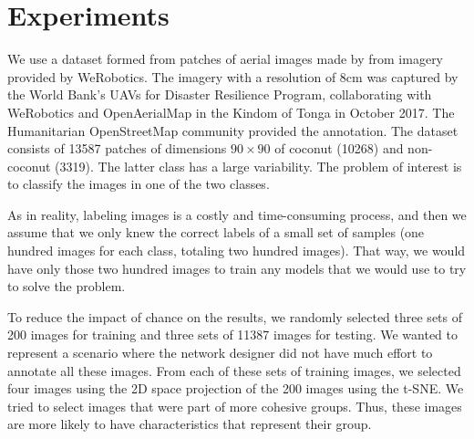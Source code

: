 \documentclass[a4paper,conference]{IEEEtran}
\begin{document}
\section{Experiments}
We use a dataset formed from patches of aerial images made by \cite{8899005} from imagery provided by WeRobotics. The imagery with a resolution of 8cm was captured by the World Bank's UAVs for Disaster Resilience Program, collaborating with WeRobotics and OpenAerialMap in the Kindom of Tonga in October 2017. The Humanitarian OpenStreetMap community provided the annotation. The dataset consists of 13587 patches of dimensions $90 \times 90$ of coconut (10268) and non-coconut (3319). The latter class has a large variability. The problem of interest is to classify the images in one of the two classes.

As in reality, labeling images is a costly and time-consuming process, and then we assume that we only knew the correct labels of a small set of samples (one hundred images for each class, totaling two hundred images). That way, we would have only those two hundred images to train any models that we would use to try to solve the problem.

To reduce the impact of chance on the results, we randomly selected three sets of 200 images for training and three sets of 11387 images for testing. We wanted to represent a scenario where the network designer did not have much effort to annotate all these images. From each of these sets of training images, we selected four images using the 2D space projection of the 200 images using the t-SNE. We tried to select images that were part of more cohesive groups. Thus, these images are more likely to have characteristics that represent their group.
\end{document}
